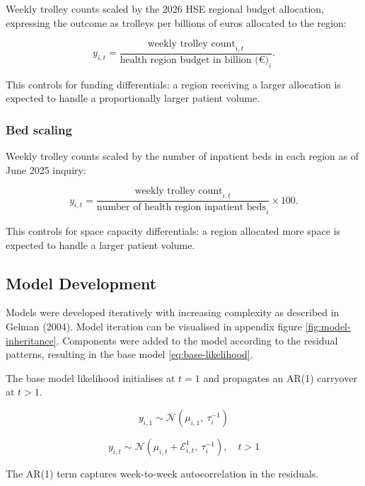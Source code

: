\documentclass[
]{article}
\begin{document}
Weekly trolley counts scaled by the 2026 HSE regional budget allocation, expressing the outcome as trolleys per billions of euros allocated to the region:

\[
y_{i,t} = \frac{\text{weekly trolley count}_{i,t}}{\text{health region budget in billion (€)}_i}.
\]

This controls for funding differentials: a region receiving a larger allocation is expected to handle a proportionally larger patient volume.

\subsubsection{Bed scaling}\label{bed-scaling}

Weekly trolley counts scaled by the number of inpatient beds in each region as of June 2025 inquiry:

\[
y_{i,t} = \frac{\text{weekly trolley count}_{i,t}}{\text{number of health region inpatient beds}_i} \times 100.
\]

This controls for space capacity differentials: a region allocated more space is expected to handle a larger patient volume.

\subsection{\texorpdfstring{Model Development \label{sect:model-development}}{Model Development }}\label{model-development}

Models were developed iteratively with increasing complexity as described in Gelman (2004). Model iteration can be visualised in appendix figure \ref{fig:model-inheritance}. Components were added to the model according to the residual patterns, resulting in the base model \eqref{eq:base-likelihood}.

The base model likelihood initialises at \(t=1\) and propagates an AR(1) carryover at \(t>1\).

\begin{equation}
y_{i,1} \sim \mathcal{N}(\mu_{i,1},\ \tau_i^{-1})
\label{eq:base-likelihood-init}
\end{equation}

\begin{equation}
y_{i,t} \sim \mathcal{N}\!\left(\mu_{i,t} + \mathcal{E}^{1}_{i,t},\ \tau_i^{-1}\right), \quad t > 1
\label{eq:base-likelihood}
\end{equation}

The AR(1) term captures week-to-week autocorrelation in the residuals.
\end{document}

